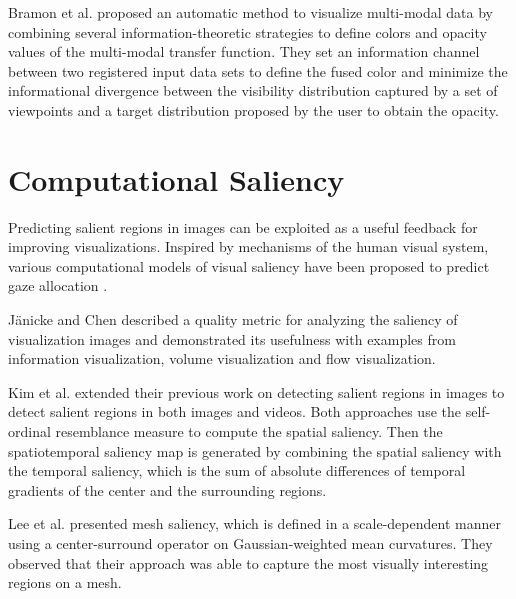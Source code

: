 Bramon et al. \cite{bramon_information_2013} proposed an automatic method to visualize multi-modal data by combining several information-theoretic strategies to define colors and opacity values of the multi-modal transfer function.
They set an information channel between two registered input data sets to define the fused color and minimize the informational divergence between the visibility distribution captured by a set of viewpoints and a target distribution proposed by the user to obtain the opacity.

\section{Computational Saliency}

Predicting salient regions in images \cite{zhao_learning_2013} can be exploited as a useful feedback for improving visualizations.
Inspired by mechanisms of the human visual system, various computational models of visual saliency have been proposed to predict gaze allocation \cite{itti_model_1998} \cite{parkhurst_modeling_2002} \cite{harel_graph-based_2006} \cite{chikkerur_what_2010} \cite{mahadevan_spatiotemporal_2010} \cite{duan_visual_2011}.

J{\"a}nicke and Chen \cite{janicke_salience-based_2010} described a quality metric for analyzing the saliency of visualization images and demonstrated its usefulness with examples from information visualization, volume visualization and flow visualization.

Kim et al. \cite{kim_spatiotemporal_2011} extended their previous work on detecting salient regions in images \cite{kim_saliency_2010} to detect salient regions in both images and videos. Both approaches use the self-ordinal resemblance measure to compute the spatial saliency. Then the spatiotemporal saliency map is generated by combining the spatial saliency with the temporal saliency, which is the sum of absolute differences of temporal gradients of the center and the surrounding regions.

Lee et al. \cite{lee_mesh_2005} presented mesh saliency, which is defined in a scale-dependent manner using a center-surround operator on Gaussian-weighted mean curvatures. They observed that their approach was able to capture the most visually interesting regions on a mesh.

